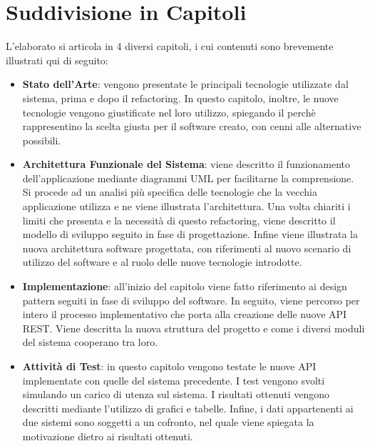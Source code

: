 \section*{Suddivisione in Capitoli}
L'elaborato si articola in 4 diversi capitoli, i cui contenuti sono brevemente illustrati qui di seguito:
\begin{itemize}
    \item \textbf{Stato dell'Arte}: vengono presentate le principali tecnologie utilizzate dal sistema, prima e dopo il refactoring. In questo capitolo, inoltre, le nuove tecnologie vengono giustificate nel loro utilizzo, spiegando il perchè rappresentino la scelta giusta per il software creato, con cenni alle alternative possibili.
    \item \textbf{Architettura Funzionale del Sistema}: viene descritto il funzionamento dell'applicazione mediante diagrammi UML per facilitarne la comprensione. Si procede ad un analisi più specifica delle tecnologie che la vecchia applicazione utilizza e ne viene illustrata l'architettura. Una volta chiariti i limiti che presenta e la necessità di questo refactoring, viene descritto il modello di sviluppo seguito in fase di progettazione. Infine viene illustrata la nuova architettura software progettata, con riferimenti al nuovo scenario di utilizzo del software e al ruolo delle nuove tecnologie introdotte.
    \item \textbf{Implementazione}: all'inizio del capitolo viene fatto riferimento ai design pattern seguiti in fase di sviluppo del software. In seguito, viene percorso per intero il processo implementativo che porta alla creazione delle nuove API REST. Viene descritta la nuova struttura del progetto e come i diversi moduli del sistema cooperano tra loro.
    \item \textbf{Attività di Test}: in questo capitolo vengono testate le nuove API implementate con quelle del sistema precedente. I test vengono svolti simulando un carico di utenza sul sistema. I risultati ottenuti vengono descritti mediante l'utilizzo di grafici e tabelle. Infine, i dati appartenenti ai due sistemi sono soggetti a un cofronto, nel quale viene spiegata la motivazione dietro ai risultati ottenuti.
\end{itemize} 